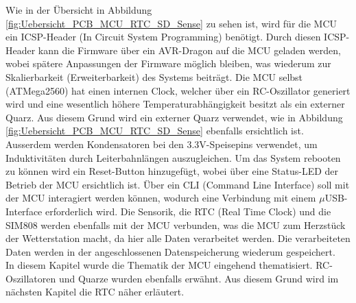 Wie in der Übersicht in Abbildung \ref{fig:Uebersicht_PCB_MCU_RTC_SD_Sense} zu sehen ist, wird für die MCU ein ICSP-Header (In Circuit System Programming) benötigt. Durch diesen ICSP-Header kann die Firmware über ein AVR-Dragon auf die MCU geladen werden, wobei spätere Anpassungen der Firmware möglich bleiben, was wiederum zur Skalierbarkeit (Erweiterbarkeit) des Systems beiträgt. Die MCU selbst (ATMega2560) hat einen internen Clock, welcher über ein RC-Oszillator generiert wird und eine wesentlich höhere Temperaturabhängigkeit besitzt als ein externer Quarz. Aus diesem Grund wird ein externer Quarz verwendet, wie in Abbildung \ref{fig:Uebersicht_PCB_MCU_RTC_SD_Sense} ebenfalls ersichtlich ist. Ausserdem werden Kondensatoren bei den 3.3V-Speisepins verwendet, um Induktivitäten durch Leiterbahnlängen auszugleichen. Um das System rebooten zu können wird ein Reset-Button hinzugefügt, wobei über eine Status-LED der Betrieb der MCU ersichtlich ist. Über ein CLI (Command Line Interface) soll mit der MCU interagiert werden können, wodurch eine Verbindung mit einem $\mu$USB-Interface erforderlich wird. Die Sensorik, die RTC (Real Time Clock) und die SIM808 werden ebenfalls mit der MCU verbunden, was die MCU zum Herzstück der Wetterstation macht, da hier alle Daten verarbeitet werden. Die verarbeiteten Daten werden in der angeschlossenen Datenspeicherung wiederum gespeichert.\\[0.5cm]
In diesem Kapitel wurde die Thematik der MCU eingehend thematisiert. RC-Oszillatoren und Quarze wurden ebenfalls erwähnt. Aus diesem Grund wird im nächsten Kapitel die RTC näher erläutert.
